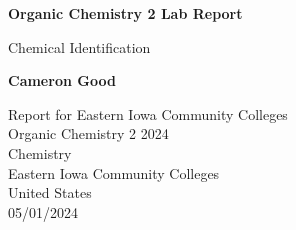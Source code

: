 \begin{titlepage}
	\begin{center}
		\vspace*{1cm}
		\LARGE
		\textbf{Organic Chemistry 2 Lab Report}
		
		\vspace{0.5cm}
		\Large
		Chemical Identification
		
		\vspace{1.5cm}
		
		\textbf{Cameron Good}
		
		\vfill
		\large
		Report for Eastern Iowa Community Colleges \\
		Organic Chemistry 2
		2024\\
		
		
		\vspace{0.5cm}
		Chemistry\\
		Eastern Iowa Community Colleges\\
		United States\\
		05/01/2024
		
	\end{center}
\end{titlepage}